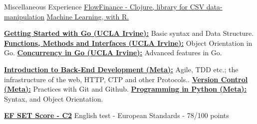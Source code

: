 \begin{rubric}{Miscellaneous Experience}
\entry*[2021]
\href{https://github.com/BuddhiLW/commons-csv-clj}{\color{blue!50!violet} FlowFinance - Clojure, library for CSV data-manipulation}
\entry*[2020]
\href{https://github.com/BuddhiLW/EEL_EstatMultiVarRN}{\color{blue!50!violet} Machine Learning, with R.}


\entry*[2022]\textbf{\href{https://buddhilw.github.io/bug-free-fiesta/}{Getting Started with Go (UCLA Irvine):}} Basic syntax and Data Structure.
\entry*[2022]\textbf{\href{https://buddhilw.github.io/bug-free-fiesta/}{Functions, Methods and Interfaces (UCLA Irvine):}} Object Orientation in Go.
\entry*[2022]\textbf{\href{https://buddhilw.github.io/bug-free-fiesta/}{Concurrency in Go (UCLA Irvine):}} Advanced features in Go.

\entry*[2022]\textbf{\href{https://buddhilw.github.io/bug-free-fiesta/}{Introduction to Back-End Development (Meta):}} Agile, TDD etc.; the infrastructure of the web, HTTP, CTP and other Protocols..
\entry*[2022]\textbf{\href{https://buddhilw.github.io/bug-free-fiesta/}{Version Control (Meta):}} Practices with Git and Github.
\entry*[2022]\textbf{\href{https://buddhilw.github.io/bug-free-fiesta/}{Programming in Python (Meta):}} Syntax, and Object Orientation.

\entry*[2022]\textbf{\href{https://buddhilw.github.io/bug-free-fiesta/}{EF SET Score - C2}} English test - European Standards - 78/100 points


\end{rubric}
